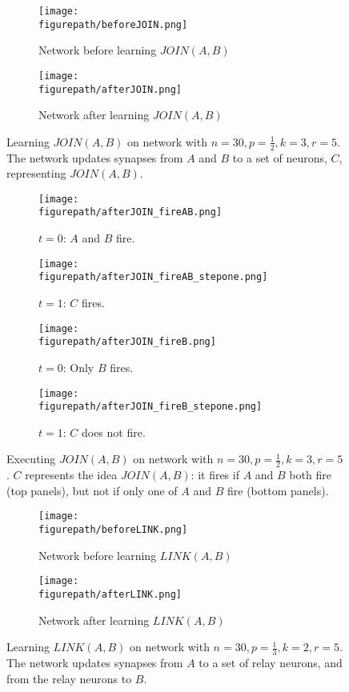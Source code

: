 \documentclass[letterpaper, 12pt]{article}
\newcommand{\figurepath}{../../Figures}
\begin{document}
\begin{figure}[!htb]
\centering
\begin{subfigure}[b]{0.45\textwidth}
      \texttt{[image: \\figurepath/beforeJOIN.png]}
      \caption*{Network before learning $JOIN(A,B)$}
\end{subfigure}
\begin{subfigure}[b]{0.45\textwidth}
      \texttt{[image: \\figurepath/afterJOIN.png]}
      \caption*{Network after learning $JOIN(A,B)$}
\end{subfigure}
\caption{Learning $JOIN(A,B)$ on network with $n=30,p=\frac{1}{2},k=3,r=5$. The network updates synapses from $A$ and $B$ to a set of neurons, $C$, representing $JOIN(A,B)$.}\label{fig:learningJOIN}
\end{figure}

\begin{figure}[!htb]
\centering
\begin{subfigure}[b]{0.45\textwidth}
      \texttt{[image: \\figurepath/afterJOIN\_fireAB.png]}
      \caption*{$t=0$: $A$ and $B$ fire.}
\end{subfigure}
\begin{subfigure}[b]{0.45\textwidth}
      \texttt{[image: \\figurepath/afterJOIN\_fireAB\_stepone.png]}
      \caption*{$t=1$: $C$ fires.}
\end{subfigure}
\begin{subfigure}[b]{0.45\textwidth}
      \texttt{[image: \\figurepath/afterJOIN\_fireB.png]}
      \caption*{$t=0$: Only $B$ fires.}
\end{subfigure}
\begin{subfigure}[b]{0.45\textwidth}
      \texttt{[image: \\figurepath/afterJOIN\_fireB\_stepone.png]}
      \caption*{$t=1$: $C$ does not fire.}
\end{subfigure}
\caption{Executing $JOIN(A,B)$ on network with $n=30,p=\frac{1}{2},k=3,r=5$. $C$ represents the idea $JOIN(A,B)$: it fires if $A$ and $B$ both fire (top panels), but not if only one of $A$ and $B$ fire (bottom panels).}\label{fig:executingJOIN}
\end{figure}

\begin{figure}[!htb]
\centering
\begin{subfigure}[b]{0.45\textwidth}
      \texttt{[image: \\figurepath/beforeLINK.png]}
      \caption*{Network before learning $LINK(A,B)$}
\end{subfigure}
\begin{subfigure}[b]{0.45\textwidth}
      \texttt{[image: \\figurepath/afterLINK.png]}
      \caption*{Network after learning $LINK(A,B)$}
\end{subfigure}
\caption{Learning $LINK(A,B)$ on network with $n=30,p=\frac{1}{3},k=2,r=5$. The network updates synapses from $A$ to a set of relay neurons, and from the relay neurons to $B$.}\label{fig:learningLINK}
\end{figure}
\end{document}
